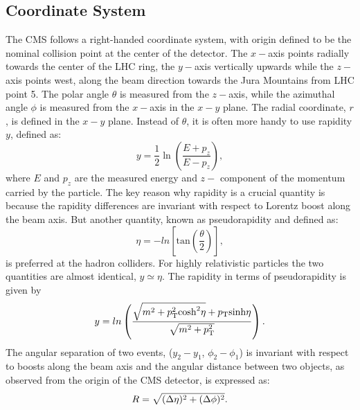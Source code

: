 \subsection{Coordinate System}\label{sec:coord}
The CMS follows a right-handed coordinate system, with origin defined to be the nominal collision point at the center of the detector.
The $x-$axis points radially towards the center of the LHC ring, the $y-$axis vertically upwards while the $z-$axis points west, along the beam
direction towards the Jura Mountains from LHC point 5. The polar angle $\theta$ is measured from the $z-$axis, while the azimuthal angle 
$\phi$ is measured from the $x-$axis in the $x-y$ plane. The radial coordinate, $r$, is defined in the $x-y$ plane. Instead of $\theta$, it is 
often more handy to use rapidity $y$, defined as:
\begin{equation}
y = \frac{1}{2}\ln\left(\frac{E+p_{z}}{E-p_{z}}\right),
\end{equation}
where $E$ and $p_{z}$ are the measured energy and $z-$ component of the momentum carried by the particle. The key reason why rapidity is a crucial 
quantity is because the rapidity differences are invariant with respect to Lorentz boost along the beam axis. But another quantity, known as 
pseudorapidity and defined as:
\begin{equation}
\eta=-ln\left[\mathrm{tan}\left(\frac{\theta}{2}\right)\right],
\end{equation}
is preferred at the hadron colliders. For highly relativistic particles the two quantities are almost identical, $y\simeq\eta$. The rapidity
in terms of pseudorapidity is given by
\begin{equation}
y = ln\left( \frac{\sqrt{m^{2} + p_{\mathrm T}^{2}\text{cosh}^{2}\eta} +p_{\mathrm T}\text{sinh}\eta}{\sqrt{m^{2} + p_{\mathrm T}^{2}}}\right).
\end{equation}
The angular separation of two events, ($y_{2}-y_{1}$, $\phi_{2}-\phi_{1}$) is invariant with respect to boosts along the beam axis
and the angular distance between two objects, as observed from the origin of the CMS detector, is expressed as:
\begin{equation}
R = \sqrt{(\Delta\eta)^{2}+(\Delta\phi)^{2}}.
\end{equation}
